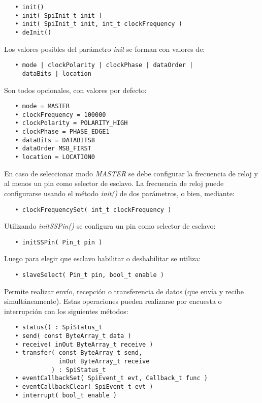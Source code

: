 \begin{verbatim}
   • init()
   • init( SpiInit_t init )
   • init( SpiInit_t init, int_t clockFrequency )
   • deInit()
\end{verbatim}

Los valores posibles del parámetro \emph{init} se forman con valores de:

\begin{verbatim}
   • mode | clockPolarity | clockPhase | dataOrder |
     dataBits | location
\end{verbatim}

Son todos opcionales, con valores por defecto:

\begin{verbatim}
   • mode = MASTER
   • clockFrequency = 100000
   • clockPolarity = POLARITY_HIGH
   • clockPhase = PHASE_EDGE1
   • dataBits = DATABITS8
   • dataOrder MSB_FIRST
   • location = LOCATION0
\end{verbatim}

En caso de seleccionar modo \emph{MASTER} se debe configurar la frecuencia de reloj y al menos un pin como selector de esclavo. La frecuencia de reloj puede configurarse usando el método \emph{init()} de dos parámetros, o bien, mediante:

\begin{verbatim}
   • clockFrequencySet( int_t clockFrequency )
\end{verbatim}

Utilizando \emph{initSSPin()} se configura un pin como selector de esclavo:

\begin{verbatim}
   • initSSPin( Pin_t pin )
\end{verbatim}

Luego para elegir que esclavo habilitar o deshabilitar se utiliza:

\begin{verbatim}
   • slaveSelect( Pin_t pin, bool_t enable )
\end{verbatim}

Permite realizar envío, recepción o transferencia de datos (que envía y recibe simultáneamente). Estas operaciones pueden realizarse por encuesta o interrupción con los siguientes métodos:

\begin{verbatim}
   • status() : SpiStatus_t
   • send( const ByteArray_t data )
   • receive( inOut ByteArray_t receive )
   • transfer( const ByteArray_t send, 
               inOut ByteArray_t receive
             ) : SpiStatus_t
   • eventCallbackSet( SpiEvent_t evt, Callback_t func )
   • eventCallbackClear( SpiEvent_t evt )
   • interrupt( bool_t enable )
\end{verbatim}

